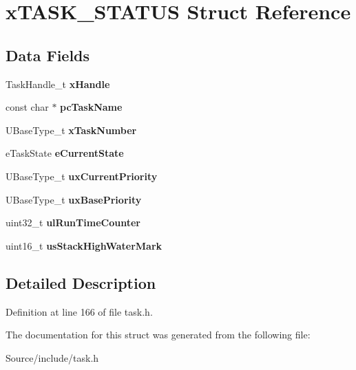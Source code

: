 \hypertarget{structx_t_a_s_k___s_t_a_t_u_s}{}\section{x\+T\+A\+S\+K\+\_\+\+S\+T\+A\+T\+U\+S Struct Reference}
\label{structx_t_a_s_k___s_t_a_t_u_s}
\subsection*{Data Fields}
\begin{DoxyCompactItemize}
\item 
\hypertarget{structx_t_a_s_k___s_t_a_t_u_s_a01ba122aba7d048809e2330ee6cbe218}{}Task\+Handle\+\_\+t {\bfseries x\+Handle}\label{structx_t_a_s_k___s_t_a_t_u_s_a01ba122aba7d048809e2330ee6cbe218}

\item 
\hypertarget{structx_t_a_s_k___s_t_a_t_u_s_a8a708f6c3c531b149994cc0a04dd009e}{}const char $\ast$ {\bfseries pc\+Task\+Name}\label{structx_t_a_s_k___s_t_a_t_u_s_a8a708f6c3c531b149994cc0a04dd009e}

\item 
\hypertarget{structx_t_a_s_k___s_t_a_t_u_s_a93c24142b1453d7b03cc172a24cf1ecf}{}U\+Base\+Type\+\_\+t {\bfseries x\+Task\+Number}\label{structx_t_a_s_k___s_t_a_t_u_s_a93c24142b1453d7b03cc172a24cf1ecf}

\item 
\hypertarget{structx_t_a_s_k___s_t_a_t_u_s_a32c7e5be97ece2b399c1ec6e1a9293cc}{}e\+Task\+State {\bfseries e\+Current\+State}\label{structx_t_a_s_k___s_t_a_t_u_s_a32c7e5be97ece2b399c1ec6e1a9293cc}

\item 
\hypertarget{structx_t_a_s_k___s_t_a_t_u_s_abfe5b9f886928c5b97be2c0d7e464ffa}{}U\+Base\+Type\+\_\+t {\bfseries ux\+Current\+Priority}\label{structx_t_a_s_k___s_t_a_t_u_s_abfe5b9f886928c5b97be2c0d7e464ffa}

\item 
\hypertarget{structx_t_a_s_k___s_t_a_t_u_s_a2278f10f240db68c88ed8bed4db8d565}{}U\+Base\+Type\+\_\+t {\bfseries ux\+Base\+Priority}\label{structx_t_a_s_k___s_t_a_t_u_s_a2278f10f240db68c88ed8bed4db8d565}

\item 
\hypertarget{structx_t_a_s_k___s_t_a_t_u_s_adc6f8d40a907816923c626eaf470a359}{}uint32\+\_\+t {\bfseries ul\+Run\+Time\+Counter}\label{structx_t_a_s_k___s_t_a_t_u_s_adc6f8d40a907816923c626eaf470a359}

\item 
\hypertarget{structx_t_a_s_k___s_t_a_t_u_s_a594a78a1e02171ab2f917122abc288c2}{}uint16\+\_\+t {\bfseries us\+Stack\+High\+Water\+Mark}\label{structx_t_a_s_k___s_t_a_t_u_s_a594a78a1e02171ab2f917122abc288c2}

\end{DoxyCompactItemize}


\subsection{Detailed Description}


Definition at line 166 of file task.\+h.



The documentation for this struct was generated from the following file\+:\begin{DoxyCompactItemize}
\item 
Source/include/task.\+h\end{DoxyCompactItemize}

